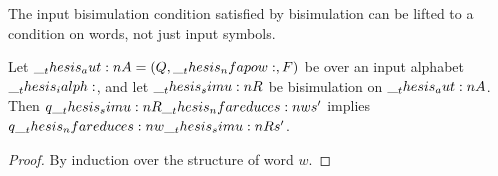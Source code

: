 

The input bisimulation condition satisfied by  bisimulation can be lifted to a condition on words, not just input symbols.
%
\begin{theorem}\label{thm:nfa-bisim:words}
  Let $\__thesis_aut:n {A} = (Q, \__thesis_nfapow:, F)$ be  over an input alphabet $\__thesis_ialph:$, and let $\__thesis_simu:n {R}$ be  bisimulation on $\__thesis_aut:n {A}$.
  Then $q \simu{R}\nfareduces[w] s'$ implies $q \nfareduces[w]\simu{R} s'$.
\end{theorem}
%
\begin{proof}
  By induction over the structure of word $w$.
\end{proof}


